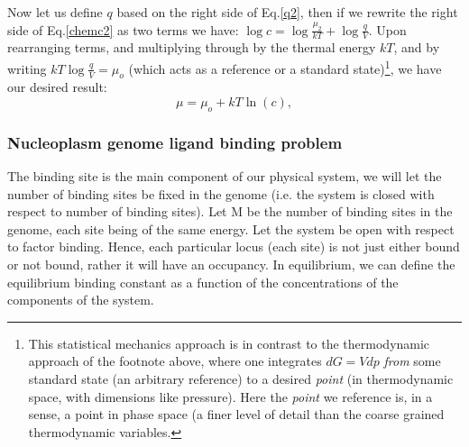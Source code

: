 Now let us define $q$ based on the right side of Eq.\ref{q2}, then if we rewrite the right side of Eq.\ref{chemc2} as two terms we have: $\log{c} =\log{\frac{ \mu_{2}}{kT} }  + \log{ \frac{ q}{V } }$.  Upon rearranging terms, and multiplying through by the thermal energy $kT$, and by writing $kT\log{ \frac{ q}{V } }=\mu_o$ (which acts as a reference or a standard state)\footnote{This statistical mechanics approach is in contrast to the thermodynamic approach of the footnote above, where one integrates $dG=Vdp$ \textit{from} some standard state (an arbitrary reference) to a desired \textit{point} (in thermodynamic space, with dimensions like pressure).  Here the \textit{point} we reference is, in a sense, a point in phase space (a finer level of detail than the coarse grained thermodynamic variables.}, we have our desired result:
\begin{equation}
\mu=\mu_o + kT\ln{(c)},
\end{equation}

\subsubsection{Nucleoplasm genome ligand binding problem}

The binding site is the main component of our physical system, we will let the number of binding sites be fixed in the genome (i.e. the system is closed with respect to number of binding sites).  Let M be the number of binding sites in the genome, each site being of the same energy.  Let the system be open with respect to factor binding. Hence, each particular locus (each site) is not just either bound or not bound, rather it will have an occupancy.  In equilibrium, we can define the equilibrium binding constant as a function of the concentrations of the components of the system.

